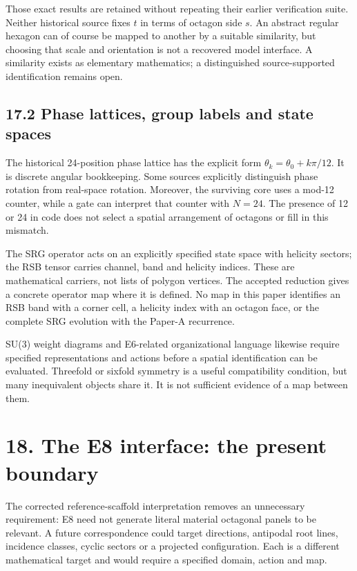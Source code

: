 \documentclass[
  11pt,
  a4paper,
]{article}
\begin{document}
Those exact results are retained without repeating their earlier verification suite. Neither historical source fixes \(t\) in terms of octagon side \(s\). An abstract regular hexagon can of course be mapped to another by a suitable similarity, but choosing that scale and orientation is not a recovered model interface. A similarity exists as elementary mathematics; a distinguished source-supported identification remains open.

\subsection{17.2 Phase lattices, group labels and state spaces}\label{phase-lattices-group-labels-and-state-spaces}

The historical 24-position phase lattice has the explicit form \(\theta_k=\theta_0+k\pi/12\). It is discrete angular bookkeeping. Some sources explicitly distinguish phase rotation from real-space rotation. Moreover, the surviving core uses a mod-12 counter, while a gate can interpret that counter with \(N=24\). The presence of 12 or 24 in code does not select a spatial arrangement of octagons or fill in this mismatch.

The SRG operator acts on an explicitly specified state space with helicity sectors; the RSB tensor carries channel, band and helicity indices. These are mathematical carriers, not lists of polygon vertices. The accepted reduction gives a concrete operator map where it is defined. No map in this paper identifies an RSB band with a corner cell, a helicity index with an octagon face, or the complete SRG evolution with the Paper-A recurrence.

SU(3) weight diagrams and E6-related organizational language likewise require specified representations and actions before a spatial identification can be evaluated. Threefold or sixfold symmetry is a useful compatibility condition, but many inequivalent objects share it. It is not sufficient evidence of a map between them.

\section{18. The E8 interface: the present boundary}\label{the-e8-interface-the-present-boundary}

The corrected reference-scaffold interpretation removes an unnecessary requirement: E8 need not generate literal material octagonal panels to be relevant. A future correspondence could target directions, antipodal root lines, incidence classes, cyclic sectors or a projected configuration. Each is a different mathematical target and would require a specified domain, action and map.
\end{document}
